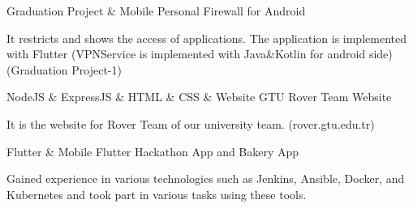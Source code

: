 \begin{cventries}
  \cventry
    {Graduation Project \& Mobile} %
    {Personal Firewall for Android} %
    { } %
    { } %
    {
      \begin{cvitems} %
        \item {It restricts and shows the
        access of applications. The application is implemented with
        Flutter (VPNService is implemented with Java\&Kotlin for
        android side) (Graduation Project-1)}
      \end{cvitems}
    }

  \cventry
    {NodeJS \& ExpressJS \& HTML \& CSS \& Website} %
    {GTU Rover Team Website} %
    { } %
    { } %
    {
      \begin{cvitems} %
        \item {It is the website for Rover Team
        of our university team. (rover.gtu.edu.tr)}
      \end{cvitems}
    }

  \cventry
    {Flutter \& Mobile} %
    {Flutter Hackathon App and Bakery App} %
    { } %
    { } %
    {
      \begin{cvitems} %
        \item {Gained experience in various technologies such as Jenkins, Ansible, Docker, and Kubernetes and took part in various tasks using these tools.}
      \end{cvitems}
    }

\end{cventries}
